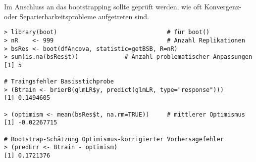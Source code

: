 Im Anschluss an das bootstrapping sollte geprüft werden, wie oft Konvergenz- oder Separierbarkeitsprobleme aufgetreten sind.
\begin{lstlisting}
> library(boot)                               # für boot()
> nR    <- 999                                # Anzahl Replikationen
> bsRes <- boot(dfAncova, statistic=getBSB, R=nR)
> sum(is.na(bsRes$t))             # Anzahl problematischer Anpassungen
[1] 5

# Traingsfehler Basisstichprobe
> (Btrain <- brierB(glmLR$y, predict(glmLR, type="response")))
[1] 0.1494605

> (optimism <- mean(bsRes$t, na.rm=TRUE))     # mittlerer Optimismus
[1] -0.02267715

# Bootstrap-Schätzung Optimismus-korrigierter Vorhersagefehler
> (predErr <- Btrain - optimism)
[1] 0.1721376
\end{lstlisting}
